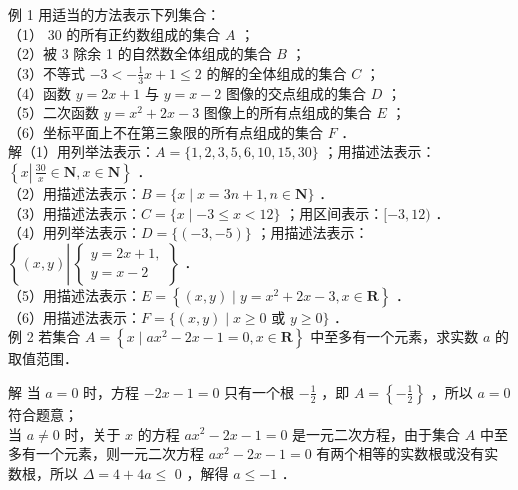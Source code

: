 \documentclass[10pt]{article}
\begin{document}
例 1 用适当的方法表示下列集合：\\
（1） 30 的所有正约数组成的集合 \(A\) ；\\
（2）被 3 除余 1 的自然数全体组成的集合 \(B\) ；\\
（3）不等式 \(-3<-\frac{1}{3} x+1 \leqslant 2\) 的解的全体组成的集合 \(C\) ；\\
（4）函数 \(y=2 x+1\) 与 \(y=x-2\) 图像的交点组成的集合 \(D\) ；\\
（5）二次函数 \(y=x^{2}+2 x-3\) 图像上的所有点组成的集合 \(E\) ；\\
（6）坐标平面上不在第三象限的所有点组成的集合 \(F\) ．\\
解（1）用列举法表示：\(A=\{1,2,3,5,6,10,15,30\}\) ；用描述法表示： \(\left\{x \left\lvert\, \frac{30}{x} \in \mathbf{N}\right., x \in \mathbf{N}\right\}\) ．\\
（2）用描述法表示：\(B=\{x \mid x=3 n+1, n \in \mathbf{N}\}\) ．\\
（3）用描述法表示：\(C=\{x \mid-3 \leqslant x<12\}\) ；用区间表示：\([-3,12)\) ．\\
（4）用列举法表示：\(D=\{(-3,-5)\}\) ；用描述法表示：\(\left\{(x, y) \left\lvert\,\left\{\begin{array}{l}y=2 x+1, \\ y=x-2\end{array}\right\}\right.\right.\) ．\\
（5）用描述法表示：\(E=\left\{(x, y) \mid y=x^{2}+2 x-3, x \in \mathbf{R}\right\}\) ．\\
（6）用描述法表示：\(F=\{(x, y) \mid x \geqslant 0\) 或 \(y \geqslant 0\}\) ．\\
例 2 若集合 \(A=\left\{x \mid a x^{2}-2 x-1=0, x \in \mathbf{R}\right\}\) 中至多有一个元素，求实数 \(a\) 的取值范围．

解 当 \(a=0\) 时，方程 \(-2 x-1=0\) 只有一个根 \(-\frac{1}{2}\) ，即 \(A=\left\{-\frac{1}{2}\right\}\) ，所以 \(a=0\) 符合题意；\\
当 \(a \neq 0\) 时，关于 \(x\) 的方程 \(a x^{2}-2 x-1=0\) 是一元二次方程，由于集合 \(A\) 中至多有一个元素，则一元二次方程 \(a x^{2}-2 x-1=0\) 有两个相等的实数根或没有实数根，所以 \(\Delta=4+4 a \leqslant\) 0 ，解得 \(a \leqslant-1\) ．
\end{document}
